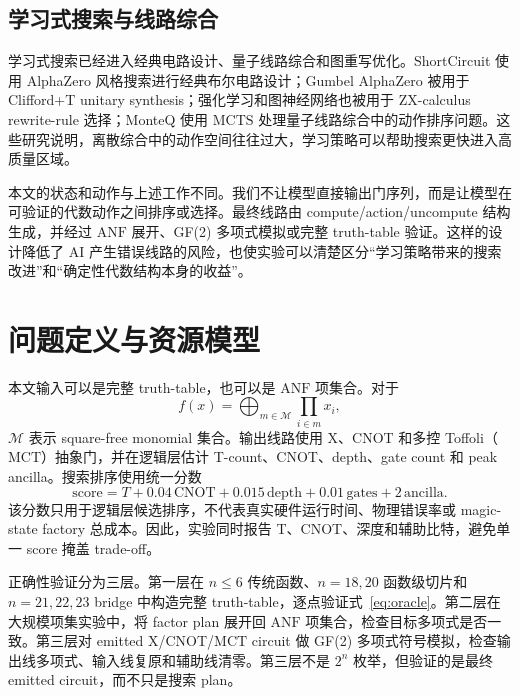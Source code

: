 \documentclass[UTF8,fontset=macnew,11pt]{ctexart}
\newcommand{\anf}{\ensuremath{\mathrm{ANF}}}
\newcommand{\mcts}{\ensuremath{\mathrm{MCTS}}}
\newcommand{\mct}{\ensuremath{\mathrm{MCT}}}
\newcommand{\score}{\ensuremath{\mathrm{score}}}
\newcommand{\ttable}{truth-table}
\begin{document}
\subsection{学习式搜索与线路综合}

学习式搜索已经进入经典电路设计、量子线路综合和图重写优化。ShortCircuit 使用 AlphaZero 风格搜索进行经典布尔电路设计\cite{tsaras2024shortcircuit}；Gumbel AlphaZero 被用于 Clifford+T unitary synthesis\cite{rietsch2024unitary}；强化学习和图神经网络也被用于 ZX-calculus rewrite-rule 选择\cite{riu2025rlzx}；MonteQ 使用 \mcts{} 处理量子线路综合中的动作排序问题\cite{machiya2026monteq}。这些研究说明，离散综合中的动作空间往往过大，学习策略可以帮助搜索更快进入高质量区域。

本文的状态和动作与上述工作不同。我们不让模型直接输出门序列，而是让模型在可验证的代数动作之间排序或选择。最终线路由 compute/action/uncompute 结构生成，并经过 \anf{} 展开、GF(2) 多项式模拟或完整 \ttable{} 验证。这样的设计降低了 AI 产生错误线路的风险，也使实验可以清楚区分“学习策略带来的搜索改进”和“确定性代数结构本身的收益”。

\section{问题定义与资源模型}

本文输入可以是完整 \ttable{}，也可以是 \anf{} 项集合。对于
\begin{equation}
  f(x)=\bigoplus_{m\in\mathcal{M}}\prod_{i\in m}x_i ,
  \label{eq:anf}
\end{equation}
$\mathcal{M}$ 表示 square-free monomial 集合。输出线路使用 X、CNOT 和多控 Toffoli（\mct{}）抽象门，并在逻辑层估计 T-count、CNOT、depth、gate count 和 peak ancilla。搜索排序使用统一分数
\begin{equation}
  \score = T + 0.04\,\mathrm{CNOT} + 0.015\,\mathrm{depth}
         + 0.01\,\mathrm{gates} + 2\,\mathrm{ancilla}.
  \label{eq:score}
\end{equation}
该分数只用于逻辑层候选排序，不代表真实硬件运行时间、物理错误率或 magic-state factory 总成本。因此，实验同时报告 T、CNOT、深度和辅助比特，避免单一 score 掩盖 trade-off。

正确性验证分为三层。第一层在 $n\leq6$ 传统函数、$n=18,20$ 函数级切片和 $n=21,22,23$ bridge 中构造完整 \ttable{}，逐点验证式~\eqref{eq:oracle}。第二层在大规模项集实验中，将 factor plan 展开回 \anf{} 项集合，检查目标多项式是否一致。第三层对 emitted X/CNOT/\mct{} circuit 做 GF(2) 多项式符号模拟，检查输出线多项式、输入线复原和辅助线清零。第三层不是 $2^n$ 枚举，但验证的是最终 emitted circuit，而不只是搜索 plan。
\end{document}
